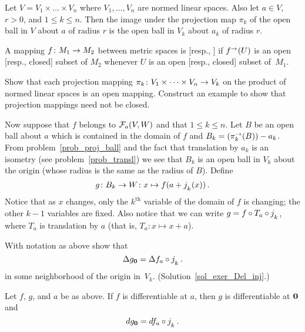 \begin{prob}\label{prob_proj_ball} Let $V = V_1 \times \dots \times V_n$ where $V_1, \dots, V_n$
are normed linear spaces.  Also let $a \in V$, $r > 0$, and $1 \le k \le n$.  Then the image
under the projection map $\pi_k$ of the open ball in $V$ about $a$ of radius $r$ is the open
ball in $V_k$ about $a_k$ of radius $r$.
\end{prob}

\begin{defn} A mapping $f \colon M_1 \rightarrow M_2$ between metric spaces is
[resp., ] if $f^\rightarrow(U)$ is an open [resp., closed] subset of $M_2$ whenever
$U$ is an open [resp., closed] subset of~$M_1$.
\end{defn}

\begin{prob} Show that each projection mapping $\pi_k\colon  V_1 \times \dots \times V_n \rightarrow V_k$
on the product of normed linear spaces is an open mapping.  Construct an example to show that
projection mappings need not be closed.
\end{prob}

Now suppose that $f$ belongs to $\mathcal{F}_a(V,W)$ and that $1 \le k \le n$.  Let $B$ be an open
ball about $a$ which is contained in the domain of $f$ and $B_k = \left(\pi_k^{\rightarrow}(B)\right)
- a_k$. From problem~\ref{prob_proj_ball} and the fact that translation by $a_k$ is an
isometry (see problem~\ref{prob_transl}) we see that $B_k$ is an open ball in $V_k$ about the
origin (whose radius is the same as the radius of $B$).  Define
  \[ g \colon B_k \rightarrow W \colon x \mapsto f(a + j_{{}_{{\scriptstyle{k}}}}(x))\,. \]
Notice that as $x$ changes, only the $k^{\text {th}}$ variable of the domain of $f$ is
changing; the other $k - 1$ variables are fixed. Also notice that we can write $g = f \circ
T_a \circ j_{{}_{{\scriptstyle{k}}}}$, where $T_a$ is translation by $a$ (that is, $T_a \colon x \mapsto
x + a$).

\begin{exer}\label{exer_Del_inj}  With notation as above show that
  \[ \Delta g_{\mathbf{0}} = \Delta f_a \circ j_{{}_{{\scriptstyle{k}}}}\,. \]
in some neighborhood of the origin in~$V_k$.  (Solution~\ref{sol_exer_Del_inj}.)
\end{exer}


\begin{prop}   Let $f$, $g$, and $a$ be as above.  If $f$ is differentiable at $a$, then $g$ is
differentiable at $\mathbf{0}$ and
  \[ dg_{\mathbf{0}} = df_a \circ j_{{}_{{\scriptstyle{k}}}}\,. \]
\end{prop}

